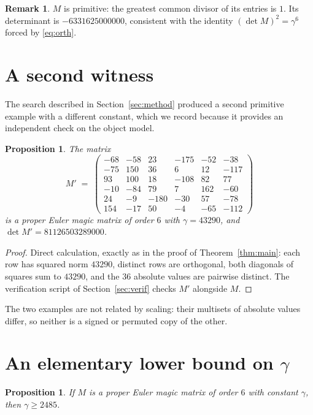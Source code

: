 \documentclass[11pt]{amsart}
\theoremstyle{plain}
\newtheorem{proposition}[theorem]{Proposition}
\theoremstyle{definition}
\newtheorem{remark}[theorem]{Remark}
\begin{document}
\begin{remark}
$M$ is primitive: the greatest common divisor of its entries is $1$. Its
determinant is $-6331625000000$, consistent with the identity
$(\det M)^2=\gamma^{6}$ forced by \eqref{eq:orth}.
\end{remark}

\section{A second witness}

The search described in Section~\ref{sec:method} produced a second primitive
example with a different constant, which we record because it provides an
independent check on the object model.

\begin{proposition}\label{prop:second}
The matrix
\[
M' \;=\;
\begin{pmatrix}
 -68 & -58 &   23 & -175 & -52 &  -38\\
 -75 & 150 &   36 &    6 &  12 & -117\\
  93 & 100 &   18 & -108 &  82 &   77\\
 -10 & -84 &   79 &    7 & 162 &  -60\\
  24 &  -9 & -180 &  -30 &  57 &  -78\\
 154 & -17 &   50 &   -4 & -65 & -112
\end{pmatrix}
\]
is a proper Euler magic matrix of order $6$ with $\gamma=43290$, and
$\det M' = 81126503289000$.
\end{proposition}

\begin{proof}
Direct calculation, exactly as in the proof of Theorem~\ref{thm:main}: each row
has squared norm $43290$, distinct rows are orthogonal, both diagonals of squares
sum to $43290$, and the $36$ absolute values are pairwise distinct. The
verification script of Section~\ref{sec:verif} checks $M'$ alongside $M$.
\end{proof}

The two examples are not related by scaling: their multisets of absolute values
differ, so neither is a signed or permuted copy of the other.

\section{An elementary lower bound on \texorpdfstring{$\gamma$}{gamma}}

\begin{proposition}\label{prop:bound}
If $M$ is a proper Euler magic matrix of order $6$ with constant $\gamma$, then
$\gamma\geq 2485$.
\end{proposition}
\end{document}
